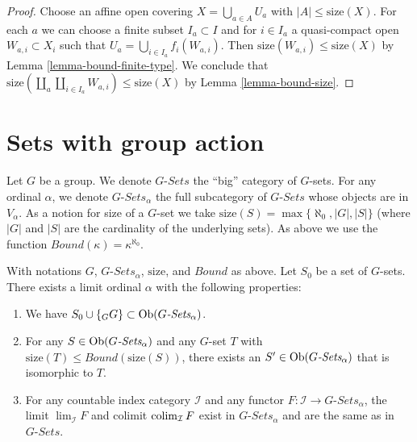 \begin{proof}
Choose an affine open covering $X = \bigcup_{a \in A} U_a$ with
$|A| \leq \text{size}(X)$. For each $a$ we can choose
a finite subset $I_a \subset I$ and for $i \in I_a$ a quasi-compact open
$W_{a, i} \subset X_i$ such that $U_a = \bigcup_{i \in I_a} f_i(W_{a, i})$.
Then $\text{size}(W_{a, i}) \leq \text{size}(X)$ by
Lemma \ref{lemma-bound-finite-type}.
We conclude that
$\text{size}(\coprod_a \coprod_{i \in I_a} W_{a, i}) \leq \text{size}(X)$
by Lemma \ref{lemma-bound-size}.
\end{proof}





\section{Sets with group action}
\label{section-sets-with-group-action}

\noindent
Let $G$ be a group. We denote $G\textit{-Sets}$ the ``big'' category
of $G$-sets. For any ordinal $\alpha$, we denote
$G\textit{-Sets}_\alpha$ the full subcategory of $G\textit{-Sets}$
whose objects are in $V_\alpha$. As a notion for size of a $G$-set
we take $\text{size}(S) = \max\{\aleph_0, |G|, |S|\}$ (where $|G|$ and
$|S|$ are the cardinality of the underlying sets). As above we use the function
$Bound(\kappa) = \kappa^{\aleph_0}$.

\begin{lemma}
\label{lemma-sets-with-group-action}
With notations $G$, $G\textit{-Sets}_\alpha$, $\text{size}$,
and $Bound$ as above. Let $S_0$ be a set of $G$-sets.
There exists a limit ordinal $\alpha$ with the following properties:
\begin{enumerate}
\item We have $S_0 \cup \{{}_GG\} \subset \mathop{\mathrm{Ob}}\nolimits(G\textit{-Sets}_\alpha)$.
\item For any $S \in \mathop{\mathrm{Ob}}\nolimits(G\textit{-Sets}_\alpha)$ and any
$G$-set $T$ with $\text{size}(T) \leq Bound(\text{size}(S))$,
there exists an $S' \in \mathop{\mathrm{Ob}}\nolimits(G\textit{-Sets}_\alpha)$
that is isomorphic to $T$.
\item For any countable index category $\mathcal{I}$ and
any functor $F : \mathcal{I} \to G\textit{-Sets}_\alpha$, the
limit $\lim_\mathcal{I} F$ and colimit
$\mathop{\mathrm{colim}}\nolimits_\mathcal{I} F$ exist in $G\textit{-Sets}_\alpha$
and are the same as in $G\textit{-Sets}$.
\end{enumerate}
\end{lemma}

